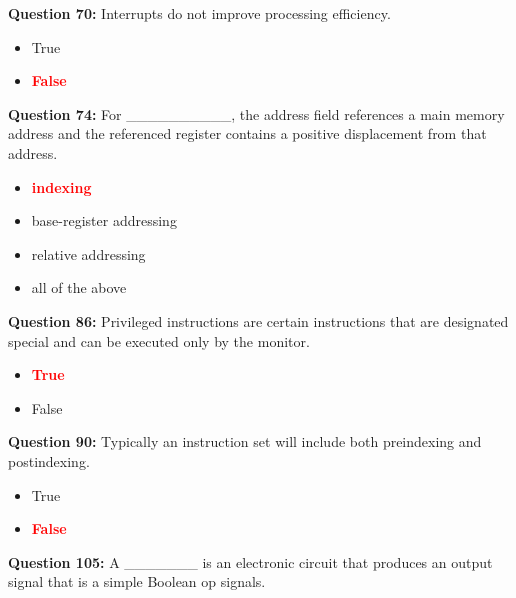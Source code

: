 \documentclass[12pt,a4paper]{article}
\begin{document}
\vspace{0.5cm}

\textbf{Question 70:} Interrupts do not improve processing efficiency.

\begin{itemize}
    \item[\textbf{A.}] True
    \item[\textbf{B.}] \textcolor{red}{\textbf{False}}
\end{itemize}

\vspace{0.5cm}

\textbf{Question 74:} For __________, the address field references a main memory address and the referenced register contains a positive displacement from that address.

\begin{itemize}
    \item[\textbf{A.}] \textcolor{red}{\textbf{indexing}}
    \item[\textbf{B.}] base-register addressing
    \item[\textbf{C.}] relative addressing
    \item[\textbf{D.}] all of the above
\end{itemize}

\vspace{0.5cm}

\textbf{Question 86:} Privileged instructions are certain instructions that are designated special and can be executed only by the monitor.

\begin{itemize}
    \item[\textbf{A.}] \textcolor{red}{\textbf{True}}
    \item[\textbf{B.}] False
\end{itemize}

\vspace{0.5cm}

\textbf{Question 90:} Typically an instruction set will include both preindexing and postindexing.

\begin{itemize}
    \item[\textbf{A.}] True
    \item[\textbf{B.}] \textcolor{red}{\textbf{False}}
\end{itemize}

\vspace{0.5cm}

\textbf{Question 105:} A _______ is an electronic circuit that produces an output signal that is a simple Boolean op signals.
\end{document}

